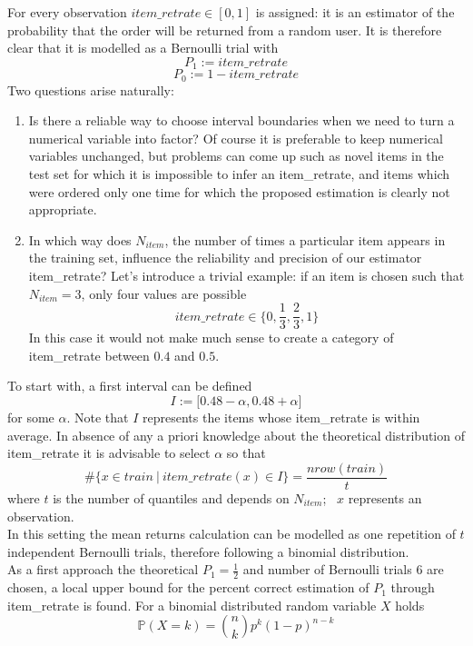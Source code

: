 \documentclass[a4paper,12pt]{article}
\begin{document}
For every observation $item\_retrate \in [0,1]$ is assigned: it is an estimator of the probability that the order will be returned from a random user. It is therefore clear that it is modelled as a Bernoulli trial with $$P_1:=item\_retrate$$ $$P_0:=1- item\_retrate$$
\newline
Two questions arise naturally:
\begin{enumerate}
\item Is there a reliable way to choose interval boundaries when we need to turn a numerical variable into factor?
\newline
Of course it is preferable to keep numerical  variables unchanged, but problems can come up such as novel items in the test set for which it is impossible to infer an item\_retrate, and items which were ordered only one time for which the proposed estimation is clearly not appropriate.
\item In which way does $N_{item}$, the number of times a particular item appears in the training set, influence the reliability and precision of our estimator item\_retrate?
\newline
Let's introduce a trivial example:
if an item is chosen such that $N_{item}=3$, only four values are possible $$item\_retrate \in  \bigg\{0,\frac{1}{3},\frac{2}{3} ,1\bigg\}$$ In this case it would not make much sense to create a category of item\_retrate between $0.4$ and $0.5$.
\end{enumerate}

To start with, a first interval can be defined $$I:=\big[0.48-\alpha, 0.48+ \alpha\big]$$ for some $\alpha$.
Note that $I$ represents the items whose item\_retrate is within average.
In absence of any a priori knowledge about the theoretical distribution of item\_retrate it is advisable to select $\alpha$ so that
$$\# \big\{ x \in train \ | \ item\_retrate(x) \in I \big\}=\frac{nrow(train)}{t} $$ where $t$ is the number of quantiles and depends on $N_{item}$; \ $x$ represents an observation. \\
In this setting the mean returns calculation can be modelled as one repetition of $t$ independent Bernoulli trials, therefore following a binomial distribution.\\
As a first approach the theoretical $P_1=\frac{1}{2}$ and number of Bernoulli trials $6$ are chosen, a local upper bound for the percent correct estimation of $P_1$ through item\_retrate is found.
For a binomial distributed random variable $X$ holds
$$\mathbb{P}(X=k) = \binom{n}{k} p^k (1-p)^{n-k}$$
\end{document}
